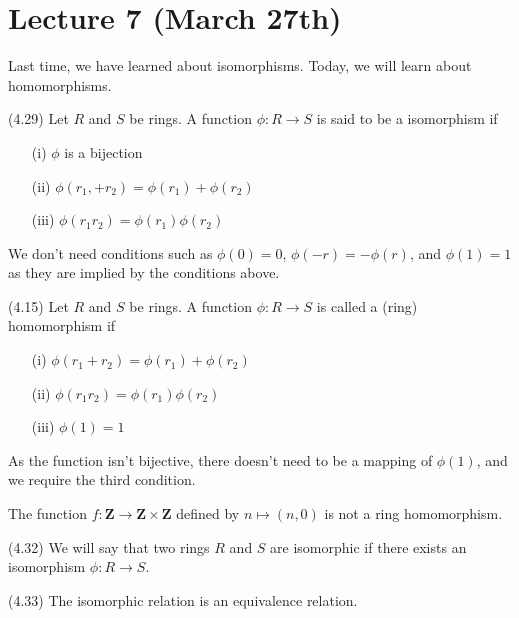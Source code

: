 \section{Lecture 7 (March 27th)}
Last time, we have learned about isomorphisms. Today, we will learn about homomorphisms. 
\\
\begin{defi}
 (4.29) Let $R$ and $S$ be rings. A function $\phi :R\rightarrow S$ is said to be a isomorphism if
\begin{itemize}
	\item[(i)] $\phi $ is a bijection 
	\item[(ii)] $\phi (r_1,+r_2)=\phi (r_1)+\phi (r_2)$
	\item[(iii)] $\phi (r_1r_2)=\phi (r_1)\phi (r_2)$
\end{itemize}
We don't need conditions such as $\phi (0)=0$, $\phi (-r)=-\phi (r)$, and $\phi (1)=1$ as they are implied by the conditions above. 
\end{defi}
\vspace{2ex}
\begin{defi}
	(4.15) Let $R$ and $S$ be rings. A function $\phi :R\rightarrow S$ is called a (ring) homomorphism if
\begin{itemize}
	\item[(i)] $\phi (r_1+r_2)=\phi (r_1)+\phi (r_2)$
	\item[(ii)] $\phi (r_1r_2)=\phi (r_1)\phi (r_2)$
	\item[(iii)] $\phi (1)=1$
\end{itemize}
As the function isn't bijective, there doesn't need to be a mapping of $\phi (1)$, and we require the third condition.
\end{defi}
\vspace{2ex}
\begin{ex}
The function $f:{\bm Z}\rightarrow {\bm Z}\times {\bm Z}$ defined by $n\mapsto (n,0)$ is not a ring homomorphism. 
\end{ex}
\vspace{2ex}
\begin{defi}
 (4.32) We will say that two rings $R$ and $S$ are isomorphic if there exists an isomorphism $\phi :R\rightarrow S$.
\end{defi}
\vspace{2ex}
\begin{rmk}
 (4.33) The isomorphic relation is an equivalence relation. 
\end{rmk}
\vspace{2ex}
